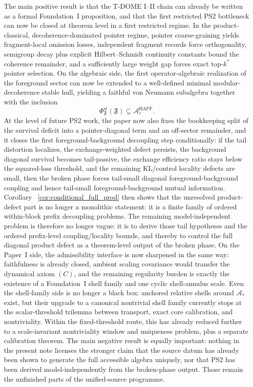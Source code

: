 \documentclass[12pt]{article}
\theoremstyle{definition}
\theoremstyle{remark}
\begin{document}
The main positive result is that the T-DOME I--II chain can already be
written as a formal Foundation~I proposition, and that the first
restricted PS2 bottleneck can now be closed at theorem level in a first
restricted regime. In the product-classical, decoherence-dominated
pointer regime, pointer coarse-graining yields fragment-local omission
losses, independent fragment records force orthogonality, semigroup
decay plus explicit Hilbert--Schmidt continuity constants bound the
coherence remainder, and a sufficiently large weight gap forces exact
top-\(k^*\) pointer selection. On the algebraic side, the first
operator-algebraic realization of the foreground sector can now be
extended to a well-defined minimal modular-decoherence stable hull,
yielding a faithful von Neumann subalgebra together with the inclusion
\[
\Phi_{\mathfrak F}^{\mathrm{st}}(\mathfrak F)\subseteq
\mathcal A_c^{\mathrm{HAFF}}.
\]
At the level of future PS2 work, the paper now also fixes the
bookkeeping split of the survival deficit into a pointer-diagonal term
and an off-sector remainder, and it closes the first
foreground-background decoupling step conditionally: if the tail
distortion localizes, the exchange-weighted defect persists, the
background diagonal survival becomes tail-passive, the exchange
efficiency ratio stays below the squared-loss threshold, and the
remaining KL/control locality defects are small, then the broken phase
forces tail-small diagonal foreground-background coupling and hence
tail-small foreground-background mutual information. Corollary~
\ref{cor:conditional_full_prod} then shows that the unresolved
product-defect part is no longer a monolithic statement: it is a finite
family of ordered within-block prefix decoupling problems.
The remaining model-independent problem is therefore no longer vague: it
is to derive those tail hypotheses and the ordered prefix-level
coupling/locality bounds, and thereby to control the full diagonal
product defect as a theorem-level output of the broken phase.
On the Paper~I side, the admissibility interface is now sharpened in the
same way: faithfulness is already closed, ambient scaling covariance
would transfer the dynamical axiom \((C)\), and the remaining regularity
burden is exactly the existence of a Foundation~I shell family and one
cyclic shell-annulus scale. Even the shell-family side is no longer a
black box: anchored relative shells around \(\mathcal A_*\) exist, but
their upgrade to a canonical nontrivial shell family currently stops at
the scalar-threshold trilemma between transport, exact core
calibration, and nontriviality. Within the fixed-threshold route, this
has already reduced further to a scale-invariant nontriviality window
and uniqueness problem, plus a separate calibration theorem.
The main negative result is equally important: nothing in the present
note licenses the stronger claim that the source datum has already been
shown to generate the full accessible algebra uniquely, nor that PS2 has
been derived model-independently from the broken-phase output. Those
remain the unfinished parts of the unified-source programme.
\end{document}
